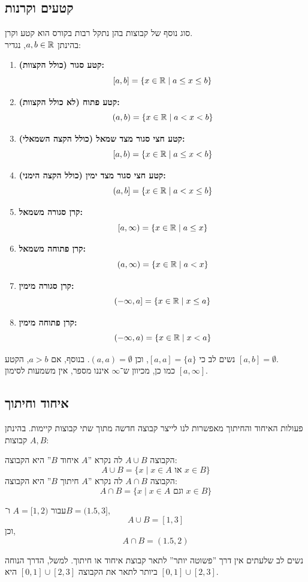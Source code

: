 \subsection{קטעים וקרנות}
סוג נוסף של קבוצות בהן נתקל רבות בקורס הוא קטע וקרן. \\
בהינתן $a, b \in \mathbb{R}$, נגדיר:
\begin{enumerate}
    \item \textbf{קטע סגור (כולל הקצוות):}
    \[
        [a, b] = \{x \in \mathbb{R} \mid a \le x \le b\}
    \]
    \item \textbf{קטע פתוח (לא כולל הקצוות):}
    \[
        (a, b) = \{x \in \mathbb{R} \mid a < x < b\}
    \]
    \item \textbf{קטע חצי סגור מצד שמאל (כולל הקצה השמאלי):}
    \[
        [a, b) = \{x \in \mathbb{R} \mid a \le x < b\}
    \]
    \item \textbf{קטע חצי סגור מצד ימין (כולל הקצה הימני):}
    \[
        (a, b] = \{x \in \mathbb{R} \mid a < x \le b\}
    \]
    \item \textbf{קרן סגורה משמאל:}
    \[
        [a, \infty) = \{x \in \mathbb{R} \mid a \le x\}
    \]
    \item \textbf{קרן פתוחה משמאל:}
    \[
        (a, \infty) = \{x \in \mathbb{R} \mid a < x\}
    \]
    \item \textbf{קרן סגורה מימין:}
    \[
        (-\infty, a] = \{x \in \mathbb{R} \mid x \le a\}
    \]
    \item \textbf{קרן פתוחה מימין:}
    \[
        (-\infty, a) = \{x \in \mathbb{R} \mid x < a\}
    \]
\end{enumerate}
\begin{remark}
	נשים לב כי $[a, a] = \{a\}$, וכן $(a, a) = \emptyset$. בנוסף, אם $a > b$, הקטע $[a, b] = \emptyset$. \\
	כמו כן, מכיוון ש־$\infty$ איננו מספר, אין משמעות לסימון $[a, \infty]$.
\end{remark}
\subsection{איחוד וחיתוך}
פעולות האיחוד והחיתוך מאפשרות לנו לייצר קבוצה חדשה מתוך שתי קבוצות קיימות. בהינתן $A, B$ קבוצות:
\begin{definition}
	הקבוצה $A \cup B$ לה נקרא ''$A$ איחוד $B$'' היא הקבוצה:
	\[
		A \cup B = \{x \mid x \in A \text{ או } x \in B\}
	\]
	הקבוצה $A \cap B$ לה נקרא ''$A$ חיתוך $B$'' היא הקבוצה:
	\[
		A \cap B = \{x \mid x \in A \text{ וגם } x \in B\}
	\]
\end{definition}
\begin{example}
	עבור $A = [1, 2)$ ו־$B = (1.5, 3]$,
	\[
		A \cup B = [1, 3]
	\]
	וכן,
	\[
		A \cap B = (1.5, 2)
	\]
\end{example}
\begin{remark}
	נשים לב שלעתים אין דרך ''פשוטה יותר'' לתאר קבוצת איחוד או חיתוך. למשל, הדרך הנוחה ביותר לתאר את הקבוצה $[0, 1] \cup [2, 3]$ היא $[0, 1] \cup [2, 3]$.
\end{remark}
